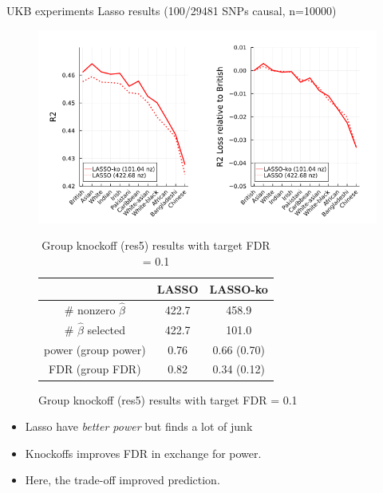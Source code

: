 \documentclass[aspectratio=169, 10pt]{beamer}
\begin{document}
\begin{frame}{UKB experiments Lasso results (100/29481 SNPs causal, n=10000)}
    \begin{minipage}[b]{0.65\linewidth}
        \begin{figure}
            \centering
            \includegraphics[width=\textwidth]{figures/k100_n10000_lasso.png}
            \begin{table}[]
                \centering
                \small
                \begin{tabular}{c|c|c}
                & LASSO & LASSO-ko\\
                \hline
                 \# nonzero $\hat{\beta}$ & 422.7 & 458.9\\
                 \# $\hat{\beta}$ selected & 422.7 & 101.0\\
                 power (group power) & 0.76 & 0.66 (0.70)\\
                 FDR (group FDR) & 0.82 & 0.34 (0.12)\\
                 \hline
            \end{tabular}
            \caption{Group knockoff (res5) results with target FDR = 0.1}
    \end{table}
    \end{figure}
    \end{minipage}
    \hspace{0.5cm}
    \begin{minipage}[b]{0.25\linewidth}
        \begin{itemize}
            \item Lasso have \textit{better power} but finds a lot of junk
            \item \alert{Knockoffs improves FDR in exchange for power}. 
            \item Here, the trade-off improved prediction.
        \end{itemize}
        \vspace{3cm}
    \end{minipage}
\end{frame}
\end{document}
